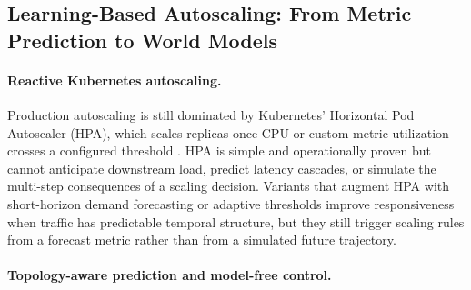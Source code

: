 \subsection{Learning-Based Autoscaling: From Metric Prediction to World Models}
\label{sec:related-learning-autoscaling}

\paragraph{Reactive Kubernetes autoscaling.}
Production autoscaling is still dominated by Kubernetes' Horizontal Pod
Autoscaler (HPA), which scales replicas once CPU or custom-metric
utilization crosses a configured threshold
\citep{rzadca2020autopilot,googlecloud2025hpa,aws2025hpa}.
HPA is simple and operationally proven but cannot anticipate downstream
load, predict latency cascades, or simulate the multi-step consequences
of a scaling decision.
Variants that augment HPA with short-horizon demand forecasting
\citep{mondal2023predictive,ahmad2024smarthpa,santos2024gwydion} or
adaptive thresholds
\citep{pozdniakova2024sla,phuc2022tahpa}
improve responsiveness when traffic has predictable temporal structure,
but they still trigger scaling rules from a forecast metric rather than
from a simulated future trajectory.

\paragraph{Topology-aware prediction and model-free control.}
\fi

